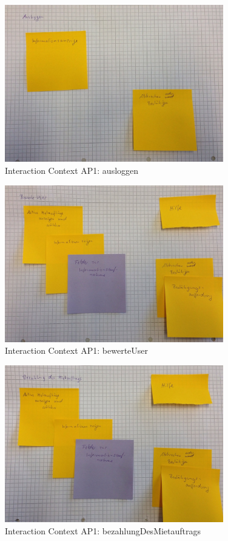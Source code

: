 \begin{figure}[H]
\centering
\includegraphics[width=0.85\textwidth]{./images/abstract/version1/ausloggen.JPG}
\caption{Interaction Context AP1: ausloggen}
\label{interfaceContents22}
\end{figure}

\begin{figure}[H]
\centering
\includegraphics[width=0.85\textwidth]{./images/abstract/version1/bewerteUser.JPG}
\caption{Interaction Context AP1: bewerteUser}
\label{interfaceContents23}
\end{figure}


\begin{figure}[H]
\centering
\includegraphics[width=0.85\textwidth]{./images/abstract/version1/bezahlungDesMietauftrags.JPG}
\caption{Interaction Context AP1: bezahlungDesMietauftrags}
\label{interfaceContents24}
\end{figure}

